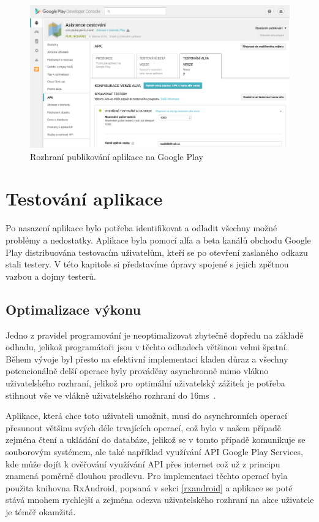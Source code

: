 \documentclass[czech,master,public,dept460,male,java,cpdeclaration]{diploma}
\begin{document}
\begin{figure}[H]
        \centering
                \includegraphics[scale=0.6]{img/playconsole.png}
        \caption{Rozhraní publikování aplikace na Google Play}
        \label{fig:playconsole}
\end{figure}


\section{Testování aplikace}
Po nasazení aplikace bylo potřeba identifikovat a odladit všechny možné problémy a nedostatky.
Aplikace byla pomocí alfa a beta kanálů obchodu Google Play
distribuována testovacím uživatelům, kteří se po otevření zaslaného odkazu stali testery.
V této kapitole si představíme úpravy spojené s jejich zpětnou vazbou a dojmy testerů.

\subsection{Optimalizace výkonu}
Jedno z pravidel programování je neoptimalizovat zbytečně dopředu na základě odhadu,
jelikož programátoři jsou v těchto odhadech většinou velmi špatní. Během vývoje byl přesto na efektivní
implementaci kladen důraz a všechny potencionálně delší operace byly prováděny asynchronně mimo vlákno
uživatelského rozhraní, jelikož pro optimální uživatelský zážitek je potřeba stihnout vše ve vlákně
uživatelského rozhraní do 16ms~\cite{perf}.

Aplikace, která chce toto uživateli umožnit, musí do asynchronních operací přesunout většinu svých déle
trvajících operací, což bylo v našem případě zejména čtení a ukládání do databáze, jelikož se v tomto
 případě komunikuje se souborovým systémem, ale také například využívání API Google Play Services,
 kde může dojít k ověřování využívání API přes internet což už z principu znamená poměrně dlouhou
 prodlevu. Pro implementaci těchto operací byla použita knihovna RxAndroid, popsaná v sekci \ref{rxandroid}
 a aplikace se poté stává mnohem rychlejší a zejména odezva uživatelského rozhraní
 na akce uživatele je téměř okamžitá.
\end{document}
